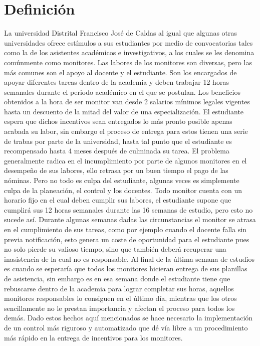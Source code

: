 \section{Definición}
La universidad Distrital Francisco José de Caldas al igual que algunas otras universidades ofrece estímulos a sus estudiantes por medio de convocatorias tales como la de los asistentes académicos e investigativos, a los cuales se les denomina comúnmente como monitores. Las labores de los monitores son diversas, pero las más comunes son el apoyo al docente y el estudiante. Son los encargados de apoyar diferentes tareas dentro de la academia y deben trabajar 12 horas semanales durante el periodo académico en el que se postulan. Los beneficios obtenidos a la hora de ser monitor van desde 2 salarios mínimos legales vigentes hasta un descuento de la mitad del valor de una especialización. 
\newline
\newline
El estudiante espera que dichos incentivos sean entregados lo más pronto posible apenas acabada su labor, sin embargo el proceso de entrega para estos tienen una serie de trabas por parte de la universidad, hasta tal punto que el estudiante es recompensado hasta 4 meses después de culminada su tarea. El problema generalmente radica en el incumplimiento por parte de algunos monitores en el desempeño de sus labores, ello retrasa por un buen tiempo el pago de las nóminas.
\newline
\newline
Pero no todo es culpa del estudiante, algunas veces es simplemente culpa de la planeación, el control y los docentes. Todo monitor cuenta con un horario fijo en el cual deben cumplir sus labores, el estudiante supone que cumplirá sus 12 horas semanales durante las 16 semanas de estudio, pero esto no sucede así. Durante algunas semanas dadas las circunstancias el monitor se atrasa en el cumplimiento de sus tareas, como por ejemplo cuando el docente falla sin previa notificación, esto genera un coste de oportunidad para el estudiante pues no solo pierde su valioso tiempo, sino que también deberá recuperar una inasistencia de la cual no es responsable.
\newline
\newline
Al final de la última semana de estudios es cuando se esperaría que todos los monitores hicieran entrega de sus planillas de asistencia, sin embargo es en esa semana donde el estudiante tiene que rebuscarse dentro de la academia para lograr completar sus horas, aquellos monitores responsables lo consiguen en  el último día, mientras que los otros sencillamente no le prestan importancia y afectan el proceso para todos los demás. Dado estos hechos aquí mencionados se hace necesario la implementación de un control más riguroso y automatizado que dé vía libre a un procedimiento más rápido en la entrega de incentivos para los monitores.
\newpage
\newpage
